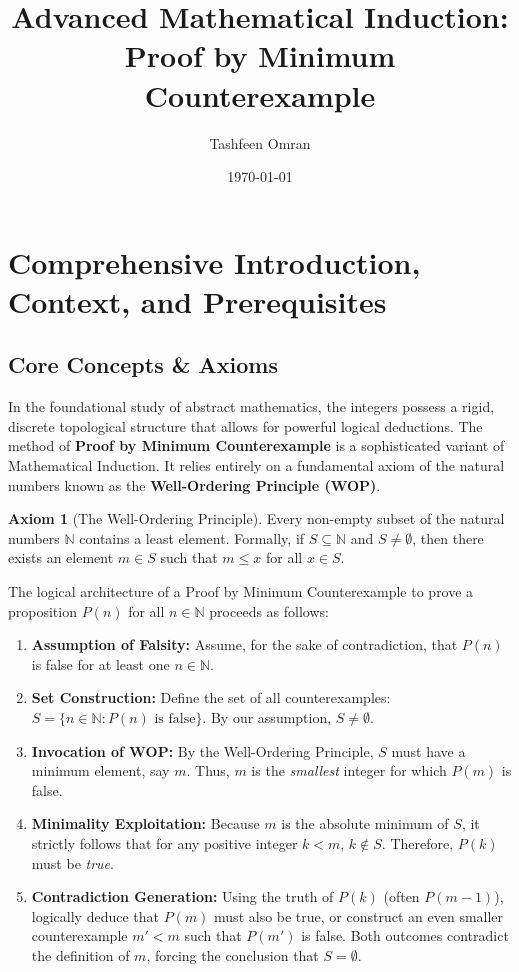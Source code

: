 \documentclass[11pt, a4paper]{article}
\title{\textbf{Advanced Mathematical Induction: \\ Proof by Minimum Counterexample}}
\author{Tashfeen Omran}
\date{\today}
\theoremstyle{definition}
\newtheorem{axiom}{Axiom}[section]
\theoremstyle{remark}
\newcommand{\N}{\mathbb{N}}
\begin{document}
\maketitle
\tableofcontents
\newpage

\section{Comprehensive Introduction, Context, and Prerequisites}

\subsection{Core Concepts \& Axioms}
In the foundational study of abstract mathematics, the integers possess a rigid, discrete topological structure that allows for powerful logical deductions. The method of \textbf{Proof by Minimum Counterexample} is a sophisticated variant of Mathematical Induction. It relies entirely on a fundamental axiom of the natural numbers known as the \textbf{Well-Ordering Principle (WOP)}.

\begin{axiom}[The Well-Ordering Principle]
Every non-empty subset of the natural numbers $\N$ contains a least element. Formally, if $S \subseteq \N$ and $S \neq \emptyset$, then there exists an element $m \in S$ such that $m \le x$ for all $x \in S$.
\end{axiom}

The logical architecture of a Proof by Minimum Counterexample to prove a proposition $P(n)$ for all $n \in \N$ proceeds as follows:
\begin{enumerate}
    \item \textbf{Assumption of Falsity:} Assume, for the sake of contradiction, that $P(n)$ is false for at least one $n \in \N$.
    \item \textbf{Set Construction:} Define the set of all counterexamples: $S = \{ n \in \N : P(n) \text{ is false} \}$. By our assumption, $S \neq \emptyset$.
    \item \textbf{Invocation of WOP:} By the Well-Ordering Principle, $S$ must have a minimum element, say $m$. Thus, $m$ is the \textit{smallest} integer for which $P(m)$ is false.
    \item \textbf{Minimality Exploitation:} Because $m$ is the absolute minimum of $S$, it strictly follows that for any positive integer $k < m$, $k \notin S$. Therefore, $P(k)$ must be \textit{true}.
    \item \textbf{Contradiction Generation:} Using the truth of $P(k)$ (often $P(m-1)$), logically deduce that $P(m)$ must also be true, or construct an even smaller counterexample $m' < m$ such that $P(m')$ is false. Both outcomes contradict the definition of $m$, forcing the conclusion that $S = \emptyset$.
\end{enumerate}
\end{document}
